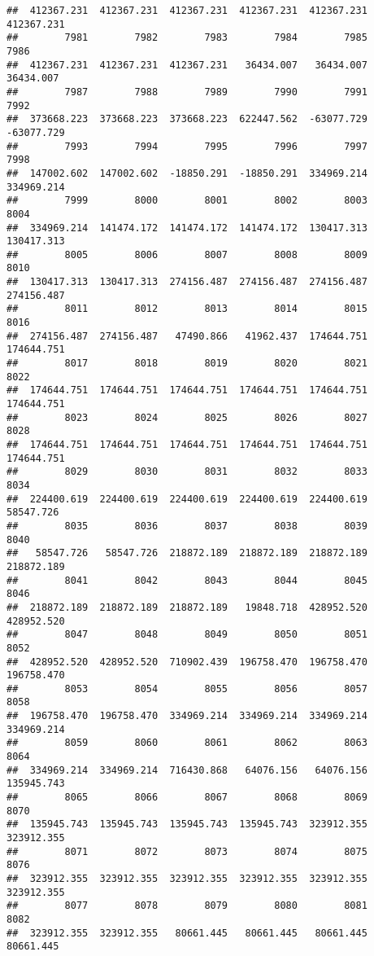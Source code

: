 \documentclass[
]{book}
\begin{document}
\begin{verbatim}
##  412367.231  412367.231  412367.231  412367.231  412367.231  412367.231 
##        7981        7982        7983        7984        7985        7986 
##  412367.231  412367.231  412367.231   36434.007   36434.007   36434.007 
##        7987        7988        7989        7990        7991        7992 
##  373668.223  373668.223  373668.223  622447.562  -63077.729  -63077.729 
##        7993        7994        7995        7996        7997        7998 
##  147002.602  147002.602  -18850.291  -18850.291  334969.214  334969.214 
##        7999        8000        8001        8002        8003        8004 
##  334969.214  141474.172  141474.172  141474.172  130417.313  130417.313 
##        8005        8006        8007        8008        8009        8010 
##  130417.313  130417.313  274156.487  274156.487  274156.487  274156.487 
##        8011        8012        8013        8014        8015        8016 
##  274156.487  274156.487   47490.866   41962.437  174644.751  174644.751 
##        8017        8018        8019        8020        8021        8022 
##  174644.751  174644.751  174644.751  174644.751  174644.751  174644.751 
##        8023        8024        8025        8026        8027        8028 
##  174644.751  174644.751  174644.751  174644.751  174644.751  174644.751 
##        8029        8030        8031        8032        8033        8034 
##  224400.619  224400.619  224400.619  224400.619  224400.619   58547.726 
##        8035        8036        8037        8038        8039        8040 
##   58547.726   58547.726  218872.189  218872.189  218872.189  218872.189 
##        8041        8042        8043        8044        8045        8046 
##  218872.189  218872.189  218872.189   19848.718  428952.520  428952.520 
##        8047        8048        8049        8050        8051        8052 
##  428952.520  428952.520  710902.439  196758.470  196758.470  196758.470 
##        8053        8054        8055        8056        8057        8058 
##  196758.470  196758.470  334969.214  334969.214  334969.214  334969.214 
##        8059        8060        8061        8062        8063        8064 
##  334969.214  334969.214  716430.868   64076.156   64076.156  135945.743 
##        8065        8066        8067        8068        8069        8070 
##  135945.743  135945.743  135945.743  135945.743  323912.355  323912.355 
##        8071        8072        8073        8074        8075        8076 
##  323912.355  323912.355  323912.355  323912.355  323912.355  323912.355 
##        8077        8078        8079        8080        8081        8082 
##  323912.355  323912.355   80661.445   80661.445   80661.445   80661.445 

\end{verbatim}
\end{document}
